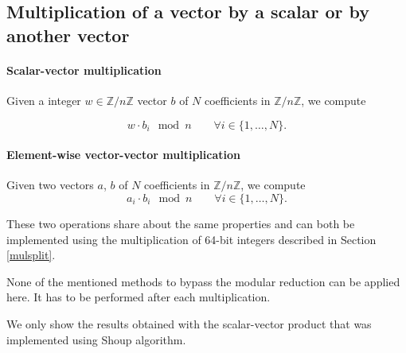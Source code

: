 \documentclass[a4paper]{article}
\begin{document}
\subsection{Multiplication of a vector by a scalar or by another vector}


\paragraph{Scalar-vector multiplication} Given a integer $w \in \mathbb{Z}/n\mathbb{Z}$ vector $b$ of $N$ coefficients in $\mathbb{Z}/n\mathbb{Z}$, we compute

\[
w \cdot b_i \mod n \qquad \forall i\in \{1,\dots,N\}.
\]

\paragraph{Element-wise vector-vector multiplication} Given two vectors $a$, $b$ of $N$ coefficients in $\mathbb{Z}/n\mathbb{Z}$, we compute
\[
a_i \cdot b_i \mod n \qquad \forall i\in \{1,\dots,N\}.
\]

\bigskip
These two operations share about the same properties and can both be implemented using the multiplication of 64-bit integers described 
in Section \ref{mulsplit}.

\begin{remark}
    None of the mentioned methods to bypass the modular reduction can be applied here. It has to be performed after each multiplication.
\end{remark}

We only show the results obtained with the scalar-vector product that was implemented using Shoup algorithm.
\end{document}
